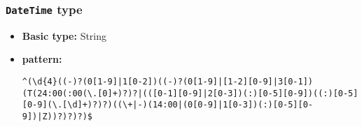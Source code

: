 \subsubsection{\texttt{DateTime} type}

\begin{itemize}
\item \textbf{Basic type:} String
	\item \textbf{pattern:} \begin{verbatim}^(\d{4}((-)?(0[1-9]|1[0-2])((-)?(0[1-9]|[1-2][0-9]|3[0-1])(T(24:00(:00(\.[0]+)?)?|(([0-1][0-9]|2[0-3])(:)[0-5][0-9])((:)[0-5][0-9](\.[\d]+)?)?)((\+|-)(14:00|(0[0-9]|1[0-3])(:)[0-5][0-9])|Z))?)?)?)$\end{verbatim}
\end{itemize}
